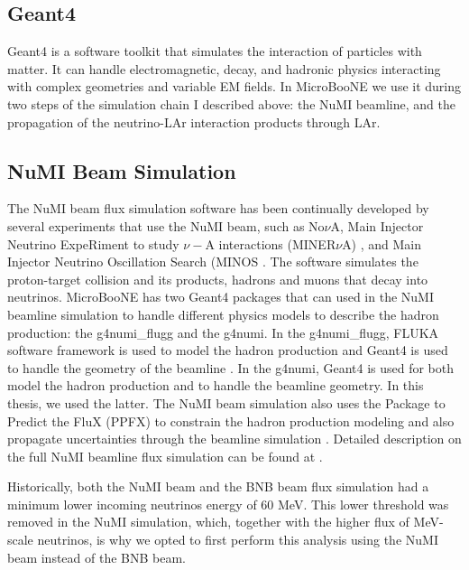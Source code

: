 \subsection{Geant4}

 Geant4 \cite{g4} is a software toolkit that simulates the interaction of particles with matter. It can handle electromagnetic, decay, and hadronic physics interacting with complex geometries and variable EM fields. In MicroBooNE we use it during two steps of the simulation chain I described above: the NuMI beamline, and the propagation of the neutrino-LAr interaction products through LAr.

\subsection{NuMI Beam Simulation}

The NuMI beam flux simulation software has been continually developed by several experiments that use the NuMI beam, such as No$\nu$A, Main Injector Neutrino ExpeRiment to study $\nu-$A interactions (MINER$\nu$A) \cite{minerva}, and Main Injector Neutrino Oscillation Search (MINOS \cite{minos}. The software simulates the proton-target collision and its products, hadrons and muons that decay into neutrinos. MicroBooNE has two Geant4 packages that can used in the NuMI beamline simulation to handle different physics models to describe the hadron production: the g4numi\_flugg and the g4numi. In the g4numi\_flugg, FLUKA software framework is used to model the hadron production and Geant4 is used to handle the geometry of the beamline \cite{fluka}. In the g4numi, Geant4 is used for both model the hadron production and to handle the beamline geometry. In this thesis, we used the latter. 
The NuMI beam simulation also uses the Package to Predict the FluX (PPFX) to constrain the hadron production modeling and also propagate uncertainties through the beamline simulation \cite{ppfx}. Detailed description on the full NuMI beamline flux simulation can be found at \cite{krish}. 

Historically, both the NuMI beam and the BNB beam flux simulation had a minimum lower incoming neutrinos energy of $60$ MeV. This lower threshold was removed in the NuMI simulation, which, together with the higher flux of MeV-scale neutrinos, is why we opted to first perform this analysis using the NuMI beam instead of the BNB beam. 


